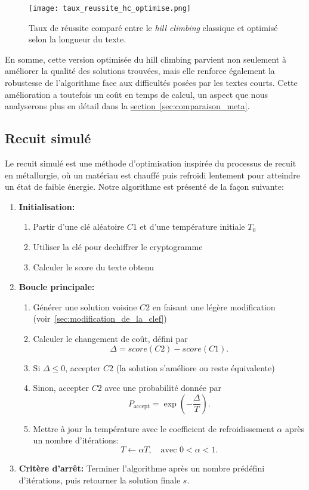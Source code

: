 \documentclass[a4paper]{article}
\begin{document}
\begin{figure}[H]
\centering
\texttt{[image: taux\_reussite\_hc\_optimise.png]}
\caption{Taux de réussite comparé entre le \textit{hill climbing} classique et optimisé selon la longueur du texte.}
\label{fig:taux_reussite_optimise}
\end{figure}

En somme, cette version optimisée du hill climbing parvient non seulement à améliorer la qualité des solutions trouvées, mais elle renforce également la robustesse de l’algorithme face aux difficultés posées par les textes courts. Cette amélioration a toutefois un coût en temps de calcul, un aspect que nous analyserons plus en détail dans la \hyperref[sec:comparaison_meta]{section~\ref*{sec:comparaison_meta}}.

\subsection{Recuit simulé}


Le recuit simulé est une méthode d’optimisation inspirée du processus de recuit en métallurgie, où un matériau est chauffé puis refroidi lentement pour atteindre un état de faible énergie.
Notre algorithme est présenté de la façon suivante:
\begin{enumerate}
    \item \textbf{Initialisation:} 
    \begin{enumerate}
        \item Partir d'une clé aléatoire $C1$ et d'une température initiale $T_0$
        \item Utiliser la clé pour dechiffrer le cryptogramme
        \item Calculer le score du texte obtenu
    \end{enumerate}
    \item \textbf{Boucle principale:}
    \begin{enumerate}[label= (\alph*)]
        \item Générer une solution voisine $C2$ en faisant une légère modification (voir~\ref{sec:modification_de_la_clef})
        \item Calculer le changement de coût, défini par
        \[
            \Delta = score(C2) - score(C1).
        \]
        \item Si $\Delta \leq 0$, accepter $C2$ (la solution s'améliore ou reste équivalente)
        \item Sinon, accepter $C2$ avec une probabilité donnée par
        \[
            P_{\text{accept}} = \exp\left(-\frac{\Delta}{T}\right).
        \]
        \item Mettre à jour la température avec le coefficient de refroidissement $\alpha$ après un nombre d'itérations:
        \[
            T \leftarrow \alpha T, \quad \text{avec } 0 < \alpha < 1.
        \]
    \end{enumerate}
    
    \item \textbf{Critère d'arrêt:} Terminer l'algorithme après un nombre prédéfini d'itérations, puis retourner la solution finale $s$.
\end{enumerate}
\end{document}
